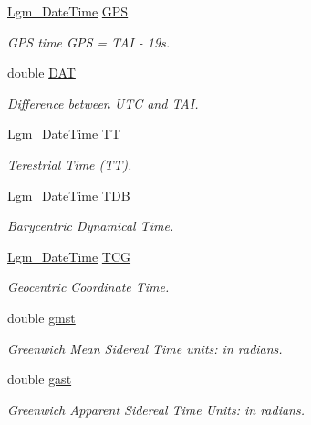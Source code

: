 \begin{CompactItemize}
\hyperlink{struct_lgm___date_time}{Lgm\_\-DateTime} \hyperlink{struct_lgm___c_trans_ab5a2a9aa455c2df8b4d45a5b06d85c1}{GPS}
\begin{CompactList}\small\item\em GPS time GPS = TAI - 19s. \item\end{CompactList}\item 
double \hyperlink{struct_lgm___c_trans_e588c8af37ba03583b88718e40df15f2}{DAT}
\begin{CompactList}\small\item\em Difference between UTC and TAI. \item\end{CompactList}\item 
\hyperlink{struct_lgm___date_time}{Lgm\_\-DateTime} \hyperlink{struct_lgm___c_trans_a4afe0bafc4dfef674b987e38ab8d80e}{TT}
\begin{CompactList}\small\item\em Terestrial Time (TT). \item\end{CompactList}\item 
\hyperlink{struct_lgm___date_time}{Lgm\_\-DateTime} \hyperlink{struct_lgm___c_trans_3c24ba5a6818123e311c951847bb90c9}{TDB}
\begin{CompactList}\small\item\em Barycentric Dynamical Time. \item\end{CompactList}\item 
\hyperlink{struct_lgm___date_time}{Lgm\_\-DateTime} \hyperlink{struct_lgm___c_trans_dcdd22f97d548861fcdd7f6912e39ecf}{TCG}
\begin{CompactList}\small\item\em Geocentric Coordinate Time. \item\end{CompactList}\item 
double \hyperlink{struct_lgm___c_trans_ba7b3bce77fb692f5e3119488e703c8c}{gmst}
\begin{CompactList}\small\item\em Greenwich Mean Sidereal Time units: in radians. \item\end{CompactList}\item 
double \hyperlink{struct_lgm___c_trans_ada0c250aaba2d37baa06b1363b2adf7}{gast}
\begin{CompactList}\small\item\em Greenwich Apparent Sidereal Time Units: in radians. \item\end{CompactList}\item 

\end{CompactItemize}
